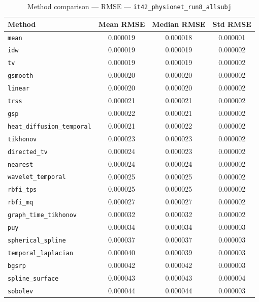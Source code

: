 \begin{table}[ht]
\centering
\caption{Method comparison — RMSE — \texttt{it42_physionet_run8_allsubj}}
\label{tab:rmse_it42_physionet_run8_allsubj}
\begin{tabular}{lccc}
\hline
Method & Mean RMSE & Median RMSE & Std RMSE \\
\hline
\texttt{mean} & 0.000019 & 0.000018 & 0.000001 \\
\texttt{idw} & 0.000019 & 0.000019 & 0.000002 \\
\texttt{tv} & 0.000019 & 0.000019 & 0.000002 \\
\texttt{gsmooth} & 0.000020 & 0.000020 & 0.000002 \\
\texttt{linear} & 0.000020 & 0.000020 & 0.000002 \\
\texttt{trss} & 0.000021 & 0.000021 & 0.000002 \\
\texttt{gsp} & 0.000022 & 0.000021 & 0.000002 \\
\texttt{heat_diffusion_temporal} & 0.000021 & 0.000022 & 0.000002 \\
\texttt{tikhonov} & 0.000023 & 0.000023 & 0.000002 \\
\texttt{directed_tv} & 0.000024 & 0.000023 & 0.000002 \\
\texttt{nearest} & 0.000024 & 0.000024 & 0.000002 \\
\texttt{wavelet_temporal} & 0.000025 & 0.000025 & 0.000002 \\
\texttt{rbfi_tps} & 0.000025 & 0.000025 & 0.000002 \\
\texttt{rbfi_mq} & 0.000027 & 0.000027 & 0.000002 \\
\texttt{graph_time_tikhonov} & 0.000032 & 0.000032 & 0.000002 \\
\texttt{puy} & 0.000034 & 0.000034 & 0.000003 \\
\texttt{spherical_spline} & 0.000037 & 0.000037 & 0.000003 \\
\texttt{temporal_laplacian} & 0.000040 & 0.000039 & 0.000003 \\
\texttt{bgsrp} & 0.000042 & 0.000042 & 0.000003 \\
\texttt{spline_surface} & 0.000043 & 0.000043 & 0.000004 \\
\texttt{sobolev} & 0.000044 & 0.000044 & 0.000003 \\
\hline
\end{tabular}
\end{table}
